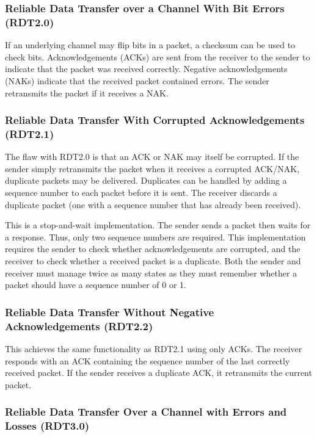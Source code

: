 \subsubsection[RDT over a Channel With Bit Errors (RDT2.0)]{Reliable Data Transfer over a Channel With Bit Errors (RDT2.0)}

If an underlying channel may flip bits in a packet, a checksum can be used to check bits.
Acknowledgements (ACKs) are sent from the receiver to the sender to indicate that the packet was received correctly.
Negative acknowledgements (NAKs) indicate that the received packet contained errors.
The sender retransmits the packet if it receives a NAK\@.

\subsubsection[RDT With Corrupted Acknowledgements (RDT2.1)]{Reliable Data Transfer With Corrupted Acknowledgements (RDT2.1)}

The flaw with RDT2.0 is that an ACK or NAK may itself be corrupted.
If the sender simply retransmits the packet when it receives a corrupted ACK/NAK, duplicate packets may be delivered.
Duplicates can be handled by adding a sequence number to each packet before it is sent.
The receiver discards a duplicate packet (one with a sequence number that has already been received).

This is a stop-and-wait implementation.
The sender sends a packet then waits for a response.
Thus, only two sequence numbers are required.
This implementation requires the sender to check whether acknowledgements are corrupted, and the receiver to check whether a received packet is a duplicate.
Both the sender and receiver must manage twice as many states as they must remember whether a packet should have a sequence number of \num{0} or \num{1}.

\subsubsection[RDT Without Negative Acknowledgements (RDT2.2)]{Reliable Data Transfer Without Negative Acknowledgements (RDT2.2)}

This achieves the same functionality as RDT2.1 using only ACKs.
The receiver responds with an ACK containing the sequence number of the last correctly received packet.
If the sender receives a duplicate ACK, it retransmits the current packet.

\subsubsection[RDT Over a Channel with Errors and Losses (RDT3.0)]{Reliable Data Transfer Over a Channel with Errors and Losses (RDT3.0)}

